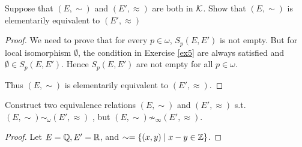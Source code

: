 \documentclass[11pt]{article}
\begin{document}
\begin{exercise}
Suppose that \((E,\sim)\) and \((E',\approx)\) are both in \(\mathcal{K}\). Show that \((E,\sim)\) is elementarily
equivalent to \((E',\approx)\)
\end{exercise}

\begin{proof}
We need to prove that for every \(p\in\omega\), \(S_p(E,E')\) is not empty. But for local
isomorphism \(\emptyset\), the condition in Exercise \ref{ex5} are always satisfied and \(\emptyset\in S_p(E,E')\).
Hence \(S_p(E,E')\) are not empty for all \(p\in\omega\).

Thus \((E,\sim)\) is elementarily equivalent to \((E',\approx)\).
\end{proof}

\begin{exercise}
Construct two equivalence relations \((E,\sim)\) and \((E',\approx)\) s.t. \((E,\sim)\sim_\omega(E',\approx)\) ,
but \((E,\sim)\not\sim_\infty(E',\approx)\).
\end{exercise}

\begin{proof}
Let \(E=\mathbb{Q},E'= \mathbb{R}\), and \(\sim=\{(x,y)\mid x-y\in\mathbb{Z}\}\).
\end{proof}
\end{document}
